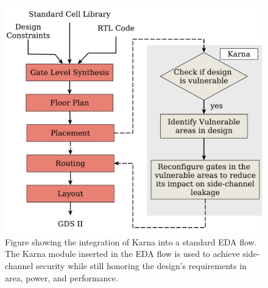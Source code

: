 
\begin{figure}[!t]
 \centering
  \includegraphics[scale=0.33]{Chapter4/karna.pdf}
  \caption{Figure showing the integration of {\sf Karna} into a standard EDA flow. The {\sf Karna} module inserted in the EDA flow is used to achieve side-channel security while still honoring the design's requirements in area, power, and performance.}
  \label{fig:vlsiflow}
  \vspace{-15pt}
\end{figure}

